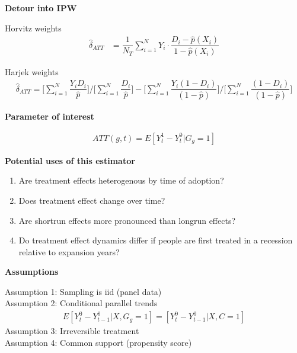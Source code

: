 \documentclass[notes=show]{beamer}
\begin{document}
\begin{frame}[plain]
\begin{center}
\textbf{Detour into IPW}
\end{center}

Horvitz weights
\begin{eqnarray*}
\widehat{\delta}_{ATT}&=\dfrac{1}{N_T} \sum_{i=1}^N Y_i \cdot \dfrac{D_i -\widehat{p}(X_i)}{1-\widehat{p}(X_i)}
\end{eqnarray*}

Harjek weights
\begin{eqnarray*}
\widehat{\delta}_{ATT}=\bigg [ \sum_{i=1}^N \dfrac{Y_iD_i}{\widehat{p}} \bigg ] / \bigg [ \sum_{i=1}^N \dfrac{D_i}{\widehat{p}} \bigg ] - \bigg [ \sum_{i=1}^N \dfrac{Y_i(1-D_i)}{(1-\widehat{p})} \bigg ] / \bigg [ \sum_{i=1}^N \dfrac{(1-D_i)}{(1-\widehat{p})} \bigg ]
\end{eqnarray*}

\end{frame}


\begin{frame}[plain]
\begin{center}
\textbf{Parameter of interest}
\end{center}

\begin{eqnarray*}
ATT(g,t) = E[Y_t^1 - Y_t^0 | G_g=1]
\end{eqnarray*}

\end{frame}

\begin{frame}[plain]
\begin{center}
\textbf{Potential uses of this estimator}
\end{center}

\begin{enumerate}
\item Are treatment effects heterogenous by time of adoption? 
\item Does treatment effect change over time?  
\item Are shortrun effects more pronounced than longrun effects? 
\item Do treatment effect dynamics differ if people are first treated in a recession relative to expansion years? 
\end{enumerate}

\end{frame}

\begin{frame}[plain]
\begin{center}
\textbf{Assumptions}
\end{center}

Assumption 1: Sampling is iid (panel data) \\
\bigskip
Assumption 2: Conditional parallel trends \\
\begin{eqnarray*}
E[Y_t^0 - Y_{t-1}^0 | X,G_g=1] = [Y_t^0 - Y_{t-1}^0 | X,C=1] 
\end{eqnarray*}
\bigskip
Assumption 3: Irreversible treatment \\
\bigskip
Assumption 4: Common support (propensity score) \\
\end{frame}
\end{document}
